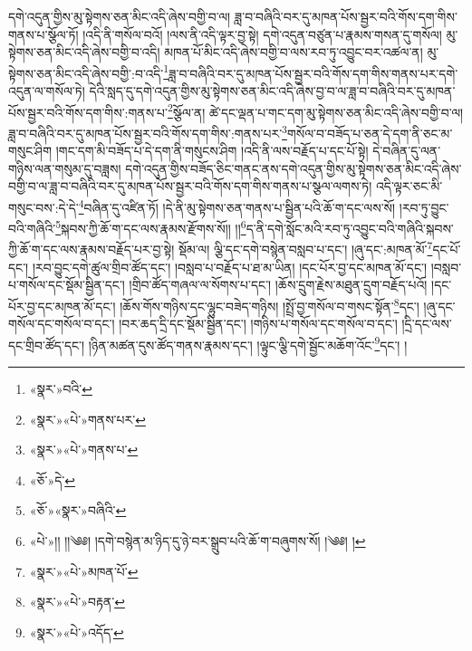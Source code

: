 དགེ་འདུན་གྱིས་མུ་སྟེགས་ཅན་མིང་འདི་ཞེས་བགྱི་བ་ལ། ཟླ་བ་བཞིའི་བར་དུ་མཁན་པོས་སྦྱར་བའི་གོས་དག་གིས་གནས་པ་སྩོལ་ཏོ། །འདི་ནི་གསོལ་བའོ། །ལས་ནི་འདི་ལྟར་བྱ་སྟེ། དགེ་འདུན་བཙུན་པ་རྣམས་གསན་དུ་གསོལ། མུ་སྟེགས་ཅན་མིང་འདི་ཞེས་བགྱི་བ་འདི། མཁན་པོ་མིང་འདི་ཞེས་བགྱི་བ་ལས་རབ་ཏུ་འབྱུང་བར་འཚལ་ན། མུ་སྟེགས་ཅན་མིང་འདི་ཞེས་བགྱི་:བ་འདི་\footnote{«སྣར་»བའི་}ཟླ་བ་བཞིའི་བར་དུ་མཁན་པོས་སྦྱར་བའི་གོས་དག་གིས་གནས་པར་དགེ་འདུན་ལ་གསོལ་ཏེ། དེའི་སླད་དུ་དགེ་འདུན་གྱིས་མུ་སྟེགས་ཅན་མིང་འདི་ཞེས་བྱ་བ་ལ་ཟླ་བ་བཞིའི་བར་དུ་མཁན་པོས་སྦྱར་བའི་གོས་དག་གིས་:གནས་པ་\footnote{«སྣར་»«པེ་»གནས་པར་}སྩོལ་ན། ཚེ་དང་ལྡན་པ་གང་དག་མུ་སྟེགས་ཅན་མིང་འདི་ཞེས་བགྱི་བ་ལ། ཟླ་བ་བཞིའི་བར་དུ་མཁན་པོས་སྦྱར་བའི་གོས་དག་གིས་:གནས་པར་\footnote{«སྣར་»«པེ་»གནས་པ་}གསོལ་བ་བཟོད་པ་ཅན་དེ་དག་ནི་ཅང་མ་གསུང་ཤིག །གང་དག་མི་བཟོད་པ་དེ་དག་ནི་གསུངས་ཤིག །འདི་ནི་ལས་བརྗོད་པ་དང་པོ་སྟེ། དེ་བཞིན་དུ་ལན་གཉིས་ལན་གསུམ་དུ་བཟླས། དགེ་འདུན་གྱིས་བཟོད་ཅིང་གནང་ནས་དགེ་འདུན་གྱིས་མུ་སྟེགས་ཅན་མིང་འདི་ཞེས་བགྱི་བ་ལ་ཟླ་བ་བཞིའི་བར་དུ་མཁན་པོས་སྦྱར་བའི་གོས་དག་གིས་གནས་པ་སྩལ་ལགས་ཏེ། འདི་ལྟར་ཅང་མི་གསུང་བས་:དེ་དེ་\footnote{«ཅོ་»དེ་}བཞིན་དུ་འཛིན་ཏོ། །དེ་ནི་མུ་སྟེགས་ཅན་གནས་པ་སྦྱིན་པའི་ཆོ་ག་དང་ལས་སོ། །རབ་ཏུ་བྱུང་བའི་གཞིའི་\footnote{«ཅོ་»«སྣར་»བཞིའི་}སྐབས་ཀྱི་ཆོ་ག་དང་ལས་རྣམས་རྫོགས་སོ།། །།\footnote{«པེ་»།། །།༄༅། །དགེ་བསྙེན་མ་ཉིད་དུ་ཉེ་བར་སྒྲུབ་པའི་ཆོ་ག་བཞུགས་སོ། །༄༅། །}ད་ནི་དགེ་སློང་མའི་རབ་ཏུ་འབྱུང་བའི་གཞིའི་སྐབས་ཀྱི་ཆོ་ག་དང་ལས་རྣམས་བརྗོད་པར་བྱ་སྟེ། སྡོམ་ལ། ལྕི་དང་དགེ་བསྙེན་བསླབ་པ་དང་། །ཞུ་དང་:མཁན་མོ་\footnote{«སྣར་»«པེ་»མཁན་པོ་}དང་པོ་དང་། །རབ་བྱུང་དགེ་ཚུལ་གྲིབ་ཚོད་དང་། །བསླབ་པ་བརྗོད་པ་ཐ་མ་ཡིན། །དང་པོར་བྱ་དང་མཁན་མོ་དང་། །བསླབ་པ་གསོལ་དང་སྡོམ་སྦྱིན་དང་། །གྲིབ་ཚོད་གཞལ་ལ་སོགས་པ་དང་། །ཆོས་དྲུག་རྗེས་མཐུན་དྲུག་བརྗོད་པའོ། །དང་པོར་བྱ་དང་མཁན་མོ་དང་། །ཆོས་གོས་གཉིས་དང་ལྷུང་བཟེད་གཉིས། །སྤྲོ་བྱ་གསོལ་བ་གསང་སྟོན་\footnote{«སྣར་»«པེ་»བརྟན་}དང་། །ཞུ་དང་གསོལ་དང་གསོལ་བ་དང་། །བར་ཆད་དྲི་དང་སྡོམ་སྦྱིན་དང་། །གཉིས་པ་གསོལ་དང་གསོལ་བ་དང་། །དྲི་དང་ལས་དང་གྲིབ་ཚོད་དང་། །ཉིན་མཚན་དུས་ཚོད་གནས་རྣམས་དང་། །ལྟུང་ལྕི་དགེ་སྦྱོང་མཆོག་འོང་\footnote{«སྣར་»«པེ་»འདོད་}དང་། །
